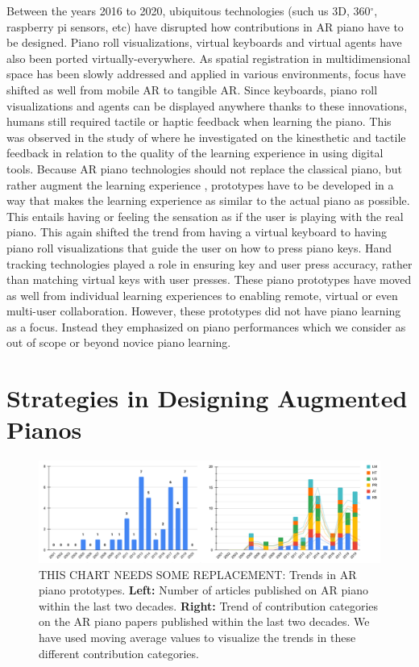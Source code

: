 \documentclass[sigchi, review]{acmart}
\begin{document}
Between the years 2016 to 2020, ubiquitous technologies (such us 3D, 360$^{\circ}$, raspberry pi sensors, etc) have disrupted how contributions in AR piano have to be designed. Piano roll visualizations, virtual keyboards and virtual agents have also been ported virtually-everywhere. As spatial registration in multidimensional space has been slowly addressed \cite{roberts2011spatial,novotny2013applications, billinghurst2008tangible} and applied in various environments, focus have shifted as well from mobile AR to tangible AR. Since keyboards, piano roll visualizations and agents can be displayed anywhere thanks to these innovations, humans still required tactile or haptic feedback when learning the piano. This was observed in the study of \citet{hamam2013effect} where he investigated on the kinesthetic and tactile feedback in relation to the quality of the learning experience in using digital tools. Because AR piano technologies should not replace the classical piano, but rather augment the learning experience \cite{yang2020modern}, prototypes have to be developed in a way that makes the learning experience as similar to the actual piano as possible. This entails having or feeling the sensation as if the user is playing with the real piano. This again shifted the trend from having a virtual keyboard to having piano roll visualizations that guide the user on how to press piano keys. Hand tracking technologies played a role in ensuring key and user press accuracy, rather than matching virtual keys with user presses. These piano prototypes have moved as well from individual learning experiences to enabling remote, virtual or even multi-user collaboration. However, these prototypes did not have piano learning as a focus. Instead they emphasized on piano performances which we consider as out of scope or beyond novice piano learning. 

\section{Strategies in Designing Augmented Pianos}
\label{sec: strat}

\begin{figure}[t]
    \centering
    \includegraphics[width=17cm]{figures/doublechart.png}
    \caption{THIS CHART NEEDS SOME REPLACEMENT: Trends in AR piano prototypes. \textbf{Left:} Number of articles published on AR piano within the last two decades. \textbf{Right:} Trend of contribution categories on the AR piano papers published within the last two decades. We have used moving average values to visualize the trends in these different contribution categories. }
    \label{fig:doublechart}
\end{figure}  
\end{document}
